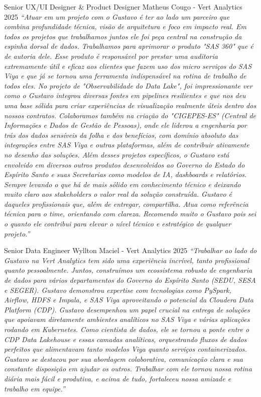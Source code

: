 \begin{cventries}
  \cventry
    {Senior UX/UI Designer \& Product Designer} %
    {Matheus Cougo - Vert Analytics} %
    {2025} %
    {} %
    {
      \textit{``Atuar em um projeto com o Gustavo é ter ao lado um parceiro que combina profundidade técnica, visão de arquitetura e foco em impacto real. Em todos os projetos que trabalhamos juntos ele foi peça central na construção da espinha dorsal de dados. Trabalhamos para aprimorar o produto "SAS 360" que é de autoria dele. Esse produto é responsável por prestar uma auditoria extremamente útil e eficaz aos clientes que fazem uso dos micro serviços do SAS Viya e que já se tornou uma ferramenta indispensável na rotina de trabalho de todos eles. No projeto de "Observabilidade do Data Lake", foi impressionante ver como o Gustavo integrou diversas fontes em pipelines resilientes e que nos deu uma base sólida para criar experiências de visualização realmente úteis dentro dos nossos contratos. Colaboramos também na criação do "CIGEPES-ES" (Central de Informações e Dados de Gestão de Pessoas), onde ele liderou a engenharia por trás dos dados sensíveis da folha e dos benefícios, com domínio absoluto das integrações entre SAS Viya e outras plataformas, além de contribuir ativamente no desenho das soluções. Além desses projetos específicos, o Gustavo está envolvido em diversos outros produtos desenvolvidos ao Governo do Estado do Espírito Santo e suas Secretarias como modelos de IA, dashboards e relatórios. Sempre levando o que há de mais sólido em conhecimento técnico e deixando muito claro aos stakeholders o valor real da solução construída. Gustavo é daqueles profissionais que, além de entregar, compartilha. Atua como referência técnica para o time, orientando com clareza. Recomendo muito o Gustavo pois sei o quanto ele contribui para elevar o nível técnico e estratégico de qualquer projeto.''}
    }


  \cventry
    {Senior Data Engineer} %
    {Wyllton Maciel - Vert Analytics} %
    {2025} %
    {} %
    {
      \textit{``Trabalhar ao lado do Gustavo na Vert Analytics tem sido uma experiência incrível, tanto profissional quanto pessoalmente. Juntos, construímos um ecossistema robusto de engenharia de dados para vários departamentos do Governo do Espírito Santo (SEDU, SESA e SEGER). Gustavo demonstrou expertise com tecnologias como PySpark, Airflow, HDFS e Impala, e SAS Viya aproveitando o potencial da Cloudera Data Platform (CDP). Gustavo desempenhou um papel crucial na entrega de soluções que apoiavam diretamente ambientes analíticos no SAS Viya e várias aplicações rodando em Kubernetes. Como cientista de dados, ele se tornou a ponte entre o CDP Data Lakehouse e essas camadas analíticas, orquestrando fluxos de dados perfeitos que alimentavam tanto modelos Viya quanto serviços containerizados. Gustavo se destacou por sua abordagem colaborativa, comunicação clara e sua constante disposição em ajudar os outros. Trabalhar com ele tornou nossa rotina diária mais fácil e produtiva, e acima de tudo, fortaleceu nossa amizade e trabalho em equipe.''}
    }


\end{cventries}
